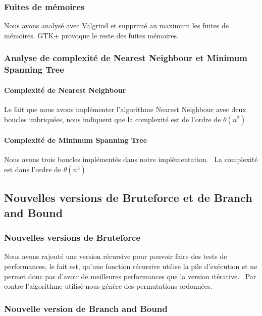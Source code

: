 \documentclass[12pt]{report}
\begin{document}
{{{{{{{\subsubsection{Fuites de mémoires}

Nous avons analysé avec Valgrind et supprimé au maximum les fuites de mémoires.
GTK+ provoque le reste des fuites mémoires.

\subsubsection{Analyse de complexité de Nearest Neighbour et Minimum Spanning Tree}

\paragraph{Complexité de Nearest Neighbour}

Le fait que nous avons implémenter l'algorithme Nearest Neighbour avec deux boucles imbriquées, nous indiquent que la complexité est de l'ordre de \(\theta(n^2)\)

\paragraph{Complexité de Minimum Spanning Tree}

Nous avons trois boucles implémentés dans notre implémentation. \
La complexité est dans l'ordre de \(\theta(n^3)\)

\subsection{Nouvelles versions de Bruteforce et de Branch and Bound}

\subsubsection{Nouvelles versions de Bruteforce}

Nous avons rajouté une version récursive pour pouvoir faire des tests de performances, le fait est, qu'une fonction récursive utilise la pile d'exécution et ne permet donc pas d'avoir de meilleures performances que la version itérative. \ 
Par contre l'algorithme utilisé nous génère des permutations ordonnées.

\subsubsection{Nouvelle version de Branch and Bound}

}}}}}}}
\end{document}
